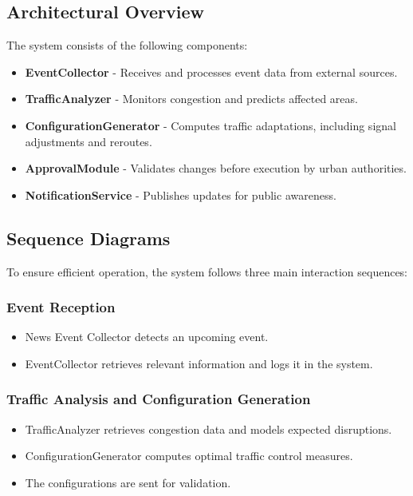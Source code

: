 \documentclass[a4paper,12pt]{article}
\begin{document}
\subsection{Architectural Overview}
The system consists of the following components:
\begin{itemize}
    \item \textbf{EventCollector} - Receives and processes event data from external sources.
    \item \textbf{TrafficAnalyzer} - Monitors congestion and predicts affected areas.
    \item \textbf{ConfigurationGenerator} - Computes traffic adaptations, including signal adjustments and reroutes.
    \item \textbf{ApprovalModule} - Validates changes before execution by urban authorities.
    \item \textbf{NotificationService} - Publishes updates for public awareness.
\end{itemize}

\subsection{Sequence Diagrams}
To ensure efficient operation, the system follows three main interaction sequences:

\subsubsection*{Event Reception}
\begin{itemize}
    \item News Event Collector detects an upcoming event.
    \item EventCollector retrieves relevant information and logs it in the system.
\end{itemize}

\subsubsection*{Traffic Analysis and Configuration Generation}
\begin{itemize}
    \item TrafficAnalyzer retrieves congestion data and models expected disruptions.
    \item ConfigurationGenerator computes optimal traffic control measures.
    \item The configurations are sent for validation.
\end{itemize}
\end{document}
